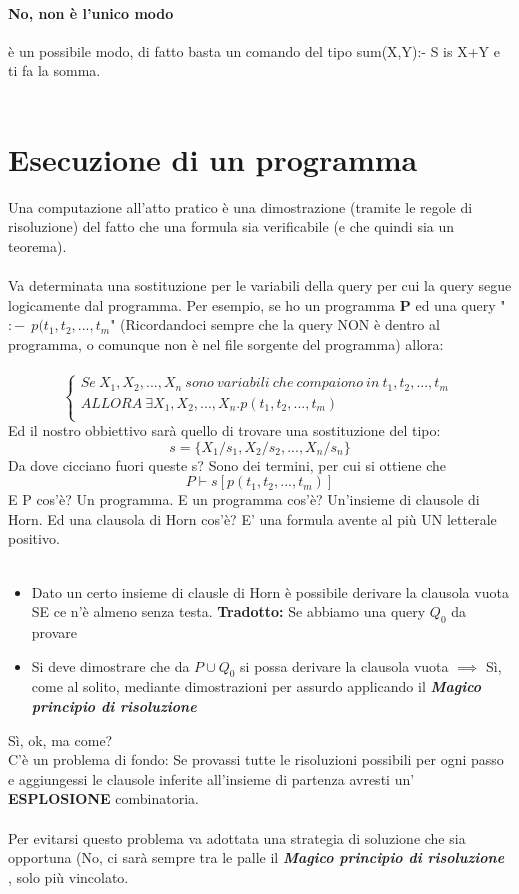 \documentclass[12pt, a4paper, openany, oneside]{book}
\begin{document}
\paragraph{No, non è l'unico modo} è un possibile modo, di fatto basta un comando
del tipo sum(X,Y):- S is X+Y e ti fa la somma.
\\ \\
\section{Esecuzione di un programma}
Una computazione all'atto pratico è una dimostrazione (tramite le regole di 
risoluzione) del fatto che una formula sia verificabile (e che quindi sia un 
teorema).
\\ \\
Va determinata una sostituzione per le variabili della query per cui la query
segue logicamente dal programma.
Per esempio, se ho un programma \textbf{P} ed una query "$:- ~~ p(t_{1}, t_{2}, ..., t_{m}$"
(Ricordandoci sempre che la query NON è dentro al programma, o comunque non è
nel file sorgente del programma) allora: \\ \\
$$\begin{cases}
Se ~ X_{1}, X_{2}, ..., X_{n} ~ sono ~ variabili ~ che ~ compaiono ~ in 
~ t_{1}, t_{2}, ..., t_{m} ~ \\ALLORA ~ \exists X_{1}, X_{2}, ..., X_{n} .
p(t_{1}, t_{2}, ..., t_{m}) \\	
\end{cases}$$
Ed il nostro obbiettivo sarà quello di trovare una sostituzione del tipo:
$$s = \{X_{1}/s_{1}, X_{2}/s_{2}, ..., X_{n}/s_{n}\}$$
Da dove cicciano fuori queste s? Sono dei termini, per cui si ottiene che
$$P \vdash s[p(t_{1}, t_{2}, ..., t_{m})]$$
E P cos'è? Un programma. E un programma cos'è? Un'insieme di clausole di Horn.
Ed una clausola di Horn cos'è? E' una formula avente al più UN letterale positivo.
\\ \\
\begin{itemize}
	\item Dato un certo insieme di clausle di Horn è possibile derivare la clausola vuota
	SE ce n'è almeno senza testa. \textbf{Tradotto: } Se abbiamo una query $Q_{0}$ da
	provare
	\item Si deve dimostrare che da $P \cup {Q_{0}}$ si possa derivare la
	clausola vuota $\implies$ Sì, come al solito, mediante dimostrazioni per
	assurdo applicando il \color{red} \textbf{\textit{Magico principio di risoluzione
	}} \color{black}
\end{itemize}
Sì, ok, ma come?\\
C'è un problema di fondo: Se provassi tutte le risoluzioni possibili per ogni passo
e aggiungessi le clausole inferite all'insieme di partenza avresti un'\textbf{
ESPLOSIONE 
} combinatoria. \\ \\
Per evitarsi questo problema va adottata una strategia di soluzione che sia 
opportuna (No, ci sarà sempre tra le palle il \color{red} \textbf{\textit{Magico principio di risoluzione
}} \color{black}, solo più vincolato. \\
\end{document}
